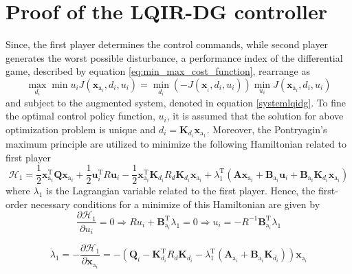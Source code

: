 \documentclass[3p]{elsarticle}
\begin{document}
\section{Proof of the LQIR-DG controller}
Since, the first player determines the control commands, while second player generates the worst possible disturbance, a performance index of the differential game, described by equation \eqref{eq:min_max_cost_function}, rearrange as
\begin{equation}
    \max_{d_i}\min{u_i} J(\mathbf{x}_{\mathrm{a}_i}, d_i, u_i) = \min_{d_i}\left(-J(\mathbf{x}_{_i}, d_i, u_i)\right)\min_{u_i}J(\mathbf{x}_{\mathrm{a}_i}, d_i, u_i)
\end{equation}
and subject to the augmented system, denoted in equation \eqref{systemlqidg}. To fine the optimal control policy function, $u_i$, it is assumed that the solution for above optimization problem is unique and $d_i = \mathbf{K}_{d_i}\mathbf{x}_{\mathrm{a}_1}$.
Moreover, the Pontryagin's maximum principle \cite{kirk2004optimal} are utilized to minimize the following Hamiltonian related to first player
\begin{equation}
    \mathcal{H}_1 = \dfrac{1}{2}\mathbf{x}_{\mathrm{a}_i}^\mathrm{T} \mathbf{Q} \mathbf{x}_{\mathrm{a}_i} + \dfrac{1}{2}\mathbf{u}_i^\mathrm{T} R \mathbf{u}_i - \dfrac{1}{2}\mathbf{x}_{\mathrm{a}_i}^\mathrm{T} \mathbf{K}_{d_i} R_{d} \mathbf{K}_{d_i}  \mathbf{x}_{\mathrm{a}_i} + \lambda_1^\mathrm{T}(\mathbf{A}\mathbf{x}_{\mathrm{a}_i} + \mathbf{B}_{\mathrm{a}_i}\mathbf{u}_i + \mathbf{B}_{\mathrm{a}_i}\mathbf{K}_{d_i}\mathbf{x}_{\mathrm{a}_i}) \end{equation}
    where $\lambda_1$ is the Lagrangian variable related to the first player. Hence, the first-order necessary conditions for a minimize of this Hamiltonian are given by
    \begin{equation}\label{eq:Hamiltonian_u}
        \dfrac{\partial \mathcal{H}_1}{\partial u_i} = 0 \Rightarrow Ru_i + \mathbf{B}_{\mathrm{a}_i}^\mathrm{T}\lambda_1 = 0 \Rightarrow u_i = -R^{-1}\mathbf{B}_{\mathrm{a}_i}^\mathrm{T}\lambda_1
    \end{equation}

\begin{equation}\label{eq:Hamiltonian_lambda}
    \dot{\lambda}_1 = -\dfrac{\partial \mathcal{H}_1}{\partial \mathbf{x}_{\mathrm{a}_i}} = -( \mathbf{Q}_i - 
    \mathbf{K}_{d_i}^\mathrm{T} R_{d} \mathbf{K}_{d_i} -\lambda_1^\mathrm{T}(\mathbf{A}_{\mathrm{a}_i} + \mathbf{B}_{\mathrm{a}_i}\mathbf{K}_{d_i})) \mathbf{x}_{\mathrm{a}_i} 
\end{equation}
\end{document}
